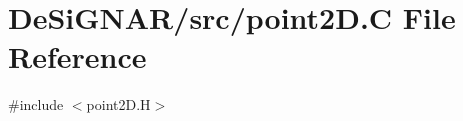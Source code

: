 \hypertarget{point2_d_8_c}{}\section{De\+Si\+G\+N\+A\+R/src/point2D.C File Reference}
\label{point2_d_8_c}
{\ttfamily \#include $<$point2\+D.\+H$>$}\newline

